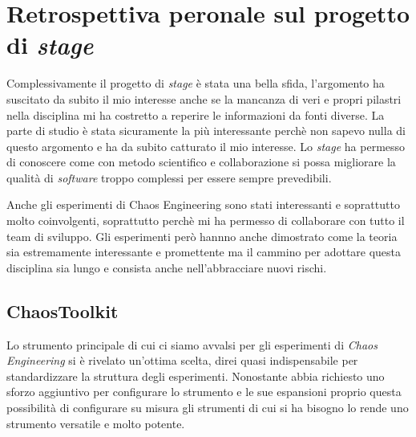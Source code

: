 \section{Retrospettiva peronale sul progetto di \textit{stage}}
Complessivamente il progetto di \textit{stage} è stata una bella sfida, l'argomento ha suscitato da subito il mio interesse anche se la mancanza di veri e propri pilastri nella disciplina mi ha costretto a reperire le informazioni da fonti diverse.
La parte di studio è stata sicuramente la più interessante perchè non sapevo nulla di questo argomento e ha da subito catturato il mio interesse.
Lo \textit{stage} ha permesso di conoscere come con metodo scientifico e collaborazione si possa migliorare la qualità di \textit{software} troppo complessi per essere sempre prevedibili.

Anche gli esperimenti di Chaos Engineering sono stati interessanti e soprattutto molto coinvolgenti, soprattutto perchè mi ha permesso di collaborare con tutto il team di sviluppo.
Gli esperimenti però hannno anche dimostrato come la teoria sia estremamente interessante e promettente ma il cammino per adottare questa disciplina sia lungo e consista anche nell'abbracciare nuovi rischi.

\subsection{ChaosToolkit}
Lo strumento principale di cui ci siamo avvalsi per gli esperimenti di \textit{Chaos Engineering} si è rivelato un'ottima scelta, direi quasi indispensabile per standardizzare la struttura degli esperimenti.
Nonostante abbia richiesto uno sforzo aggiuntivo per configurare lo strumento e le sue espansioni proprio questa possibilità di configurare su misura gli strumenti di cui si ha bisogno lo rende uno strumento versatile e molto potente.


